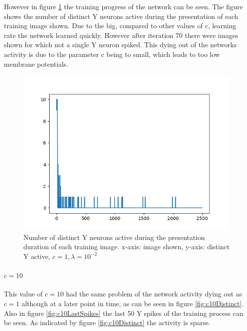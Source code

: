 However in figure \ref{fig:c1Distinct} the training progress of the network can be seen. The figure shows the number of distinct Y neurons active during the presentation of each training image shown. Due to the big, compared to other values of c, learning rate the network learned quickly. However after iteration 70 there were images shown for which not a single Y neuron spiked. This dying out of the networks activity is due to the parameter c being to small, which leads to too low membrane potentials.

\begin{figure}
  \includegraphics[width=\linewidth]{figures/angleNetwork/c1Distinct.png}
  \caption{Number of distinct Y neurons active during the presentation duration of each training image. x-axis: image shown, y-axis: distinct Y active, $c = 1, \lambda = 10^{-2}$}
  \label{fig:c1Distinct}
\end{figure}

\paragraph{$c = 10$}
This value of $c = 10$ had the same problem of the network activity dying out as $c = 1$ although at a later point in time, as can be seen in figure \ref{fig:c10Distinct}. Also in figure \ref{fig:c10LastSpikes} the last 50 Y spikes of the training process can be seen. As indicated by figure \ref{fig:c10Distinct} the activity is sparse.

